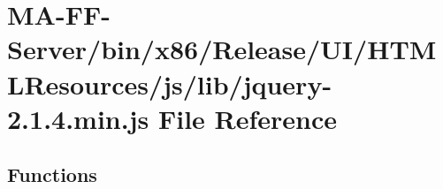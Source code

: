 \hypertarget{bin_2x86_2_release_2_u_i_2_h_t_m_l_resources_2js_2lib_2jquery-2_81_84_8min_8js}{}\section{M\+A-\/\+F\+F-\/\+Server/bin/x86/\+Release/\+U\+I/\+H\+T\+M\+L\+Resources/js/lib/jquery-\/2.1.4.min.\+js File Reference}
\label{bin_2x86_2_release_2_u_i_2_h_t_m_l_resources_2js_2lib_2jquery-2_81_84_8min_8js}
\subsection*{Functions}
